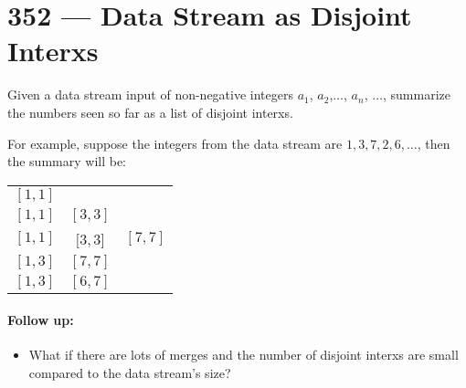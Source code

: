 \section{352 --- Data Stream as Disjoint Interxs}
Given a data stream input of non-negative integers $ a_1 $, $ a_2 $,$ \ldots$, $ a_n $, $ \ldots $, summarize the numbers seen so far as a list of disjoint interxs.
\par
For example, suppose the integers from the data stream are $ 1, 3, 7, 2, 6, \ldots $, then the summary will be:
\begin{tabular}{ccc}
$ [1, 1] $ & & \\
$ [1, 1] $ & $ [3, 3] $ & \\
$ [1, 1] $ & $ [3, 3 $] & $ [7, 7] $\\
$ [1, 3] $ & $ [7, 7] $  & \\
$ [1, 3] $ & $ [6, 7] $
\end{tabular}


\paragraph{Follow up:}
\begin{itemize}
\item What if there are lots of merges and the number of disjoint interxs are small compared to the data stream's size?
\end{itemize}

